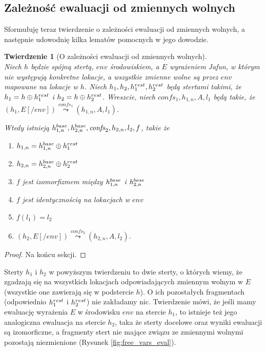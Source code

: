 \documentclass[]{pracamgr}
\renewcommand \| {\hspace{0.75em} | \hspace{0.75em} }
\renewcommand \[ {[\![}
\renewcommand \] {]\!]}
\newcommand \eval [1] {\overset{#1}{\leadsto}}
\newtheorem{theorem}{Twierdzenie}
\theoremstyle{definition}
\begin{document}
\subsection{Zależność ewaluacji od zmiennych wolnych}
Sformułuję teraz twierdzenie o zależności ewaluacji od zmiennych wolnych,
a następnie udowodnię kilka lematów pomocnych w jego dowodzie.
\begin{theorem}[O zależności ewaluacji od zmiennych wolnych]{\ } \\
    Niech $h$ będzie spójną stertą, $env$ środowiskiem,
    a $E$ wyrażeniem Jafun, w którym nie występują konkretne lokacje, a wszystkie zmienne wolne są przez $env$ mapowane
    na lokacje w $h$.
    Niech $h_1, h_2, h^{rest}_1, h^{rest}_2$ będą stertami takimi, że
    $h_1 = h \oplus h^{rest}_1$ i $h_2 = h \oplus h^{rest}_2$.
    Wreszcie, niech $\mathit{confs_1}, h_{1,n}, A, l_1$ będą takie, że $(h_1, E[/env]) \eval{confs_1} (h_{1,n}, A, l_1)$.
    
    Wtedy istnieją  $h^{base}_{1, n}, h^{base}_{2, n}, \mathit{confs}_2, h_{2, n}, l_2, f$, takie że
    \begin{enumerate}
     \item $h_{1, n} = h^{base}_{1, n} \oplus h^{rest}_1$
     \item $h_{2, n} = h^{base}_{2, n} \oplus h^{rest}_2$
     \item $f$ jest izomorfizmem między $h^{base}_{1, n}$ i $h^{base}_{2, n}$
     \item $f$ jest identycznością na lokacjach w $env$
     \item $f(l_1) = l_2$
     \item $(h_2, E[/env]) \eval{confs_2} (h_{2,n}, A, l_2)$.
    \end{enumerate}
\end{theorem}
\begin{proof}
Na końcu sekcji.
\end{proof}

Sterty $h_1$ i $h_2$ w powyższym twierdzeniu to dwie sterty, o których wiemy, że zgadzają się
na wszystkich lokacjach odpowiadających zmiennym wolnym w $E$ (wszystkie one zawierają się w podstercie $h$).
O ich pozostałych fragmentach (odpowiednio $h^{rest}_1$ i $h^{rest}_2$) nie zakładamy nic.
Twierdzenie mówi, że jeśli mamy ewaluację wyrażenia $E$ w środowisku $env$ na stercie $h_1$,
to istnieje też jego analogiczna ewaluacja na stercie $h_2$,
taka że sterty docelowe oraz wyniki ewaluacji są izomorficzne, a fragmenty stert nie mające związu ze zmiennymi wolnymi
pozostają niezmienione (Rysunek \ref{fig:free_vars_eval}).
\end{document}

